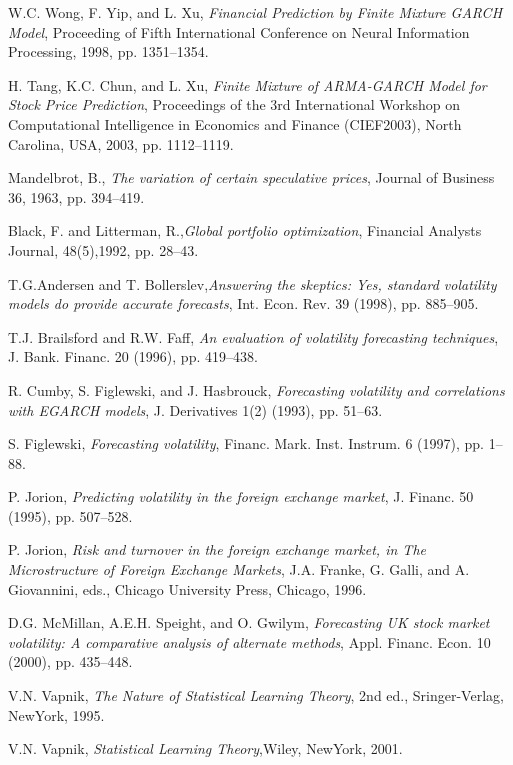 \begin{thebibliography}{9}
W.C. Wong, F. Yip, and L. Xu, \textit{Financial Prediction by Finite Mixture GARCH Model}, Proceeding of Fifth International Conference on Neural Information Processing, 1998, pp. 1351–1354.

H. Tang, K.C. Chun, and L. Xu, \textit{Finite Mixture of ARMA-GARCH Model for Stock Price Prediction}, Proceedings of the 3rd International Workshop on Computational Intelligence in Economics and Finance (CIEF2003), North
Carolina, USA, 2003, pp. 1112–1119.

Mandelbrot, B., \textit{The variation of certain speculative prices}, Journal of Business 36, 1963, pp. 394–419.

Black, F. and Litterman, R.,\textit{Global portfolio optimization}, Financial Analysts Journal, 48(5),1992, pp. 28–43.

T.G.Andersen and T. Bollerslev,\textit{Answering the skeptics: Yes, standard volatility models do provide accurate forecasts}, Int. Econ. Rev. 39 (1998), pp. 885–905.

T.J. Brailsford and R.W. Faff, \textit{An evaluation of volatility forecasting techniques}, J. Bank. Financ. 20 (1996), pp. 419–438.

R. Cumby, S. Figlewski, and J. Hasbrouck, \textit{Forecasting volatility and correlations with EGARCH models}, J. Derivatives 1(2) (1993), pp. 51–63.

S. Figlewski, \textit{Forecasting volatility}, Financ. Mark. Inst. Instrum. 6 (1997), pp. 1–88.

P. Jorion, \textit{Predicting volatility in the foreign exchange market}, J. Financ. 50 (1995), pp. 507–528.

 P. Jorion, \textit{Risk and turnover in the foreign exchange market, in The Microstructure of Foreign Exchange Markets}, J.A. Franke, G. Galli, and A. Giovannini, eds., Chicago University Press, Chicago, 1996.

D.G. McMillan, A.E.H. Speight, and O. Gwilym, \textit{Forecasting UK stock market volatility: A comparative analysis of alternate methods}, Appl. Financ. Econ. 10 (2000), pp. 435–448.

V.N. Vapnik, \textit{The Nature of Statistical Learning Theory}, 2nd ed., Sringer-Verlag, NewYork, 1995.


V.N. Vapnik, \textit{Statistical Learning Theory},Wiley, NewYork, 2001.


\end{thebibliography}
